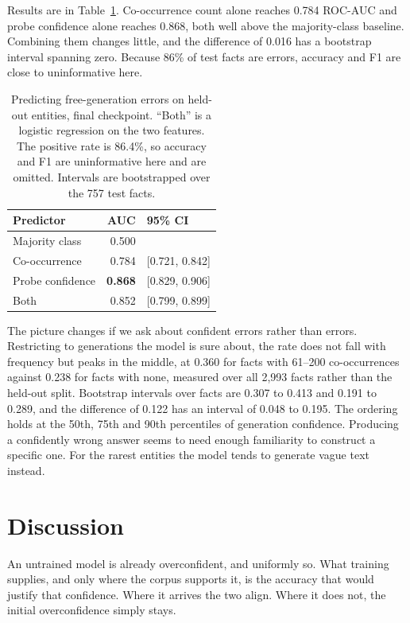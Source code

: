 \documentclass[11pt]{article}
\begin{document}
Results are in Table~\ref{tab:baselines}. Co-occurrence count alone reaches 0.784 ROC-AUC and
probe confidence alone reaches 0.868, both well above the majority-class baseline. Combining them
changes little, and the difference of 0.016 has a bootstrap interval spanning zero. Because
86\% of test facts are errors, accuracy and F1 are close to uninformative here.

\begin{table}[t]
\centering\small
\begin{tabular}{lrl}
\toprule
\textbf{Predictor} & \textbf{AUC} & \textbf{95\% CI} \\
\midrule
Majority class  & 0.500 & \\
Co-occurrence   & 0.784 & [0.721, 0.842] \\
Probe confidence& \textbf{0.868} & [0.829, 0.906] \\
Both            & 0.852 & [0.799, 0.899] \\
\bottomrule
\end{tabular}
\caption{Predicting free-generation errors on held-out entities, final checkpoint. ``Both'' is a
logistic regression on the two features. The positive rate is 86.4\%, so accuracy and F1 are
uninformative here and are omitted. Intervals are bootstrapped over the 757 test facts.}
\label{tab:baselines}
\end{table}

The picture changes if we ask about confident errors rather than errors. Restricting to
generations the model is sure about, the rate does not fall with frequency but peaks in the
middle, at 0.360 for facts with 61--200 co-occurrences against 0.238 for facts with none, measured
over all 2{,}993 facts rather than the held-out split.
Bootstrap intervals over facts are 0.307 to 0.413 and 0.191 to 0.289, and the difference of 0.122
has an interval of 0.048 to 0.195. The ordering holds at the 50th, 75th and 90th percentiles of
generation confidence. Producing a confidently wrong answer seems to need enough
familiarity to construct a specific one. For the rarest entities the model tends to generate
vague text instead.

\section{Discussion}

An untrained model is already overconfident, and uniformly so. What training supplies, and only
where the corpus supports it, is the accuracy that would justify that confidence. Where it
arrives the two align. Where it does not, the initial overconfidence simply stays.
\end{document}

